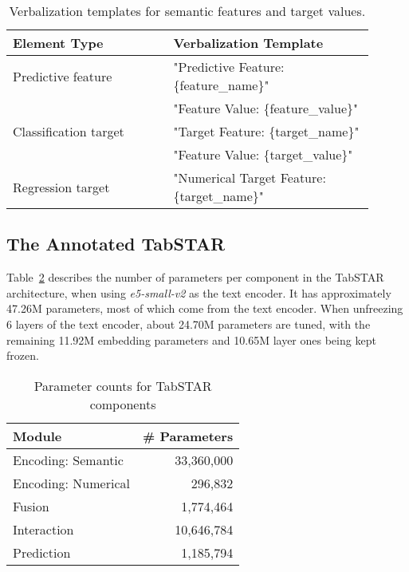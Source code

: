 \begin{table}[h]
\centering
\caption{Verbalization templates for semantic features and target values.}
\begin{tabular}{p{0.4\linewidth}p{0.5\linewidth}}
\toprule
\textbf{Element Type} & \textbf{Verbalization Template} \\
\midrule
Predictive feature      & "Predictive Feature: \{feature\_name\}" \\
                        & "Feature Value: \{feature\_value\}" \\[1ex]
Classification target   & "Target Feature: \{target\_name\}" \\
                        & "Feature Value: \{target\_value\}" \\[1ex]
Regression target       & "Numerical Target Feature: \{target\_name\}" \\
\bottomrule
\end{tabular}
\label{tab:verbalization_templates}
\end{table}

\subsection{The Annotated TabSTAR}

Table~\ref{tab:param_counts} describes the number of parameters per component in the TabSTAR architecture, when using \textit{e5-small-v2} \cite{wang_text_2024} as the text encoder. It has approximately 47.26M parameters, most of which come from the text encoder. When unfreezing 6 layers of the text encoder, about 24.70M parameters are tuned, with the remaining 11.92M embedding parameters and 10.65M layer ones being kept frozen. 



\begin{table}[h]
\centering
\caption{Parameter counts for TabSTAR components}
\begin{tabular}{l r}
\toprule
\textbf{Module} & \textbf{\# Parameters} \\
\midrule
Encoding: Semantic   & 33,360,000 \\
Encoding: Numerical                &    296,832 \\
Fusion                      &  1,774,464 \\
Interaction & 10,646,784 \\
Prediction  &  1,185,794 \\
\bottomrule
\end{tabular}
\label{tab:param_counts}
\end{table}


